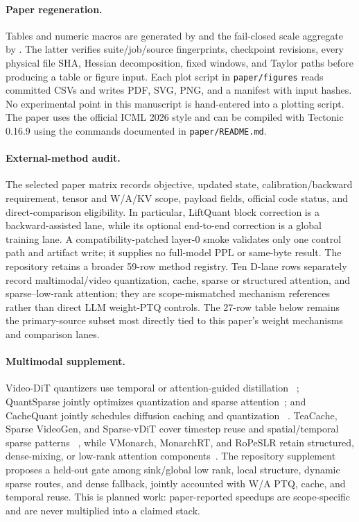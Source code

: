 \paragraph{Paper regeneration.}
Tables and numeric macros are generated by
 and the fail-closed scale
aggregate by .  The latter verifies
suite/job/source fingerprints, checkpoint revisions, every physical file SHA,
Hessian decomposition, fixed windows, and Taylor paths before producing a
table or figure input.  Each plot script in
\texttt{paper/figures} reads committed CSVs and writes PDF, SVG, PNG, and a
manifest with input hashes.  No experimental point in this manuscript is
hand-entered into a plotting script.  The paper uses the official ICML 2026
style and can be compiled with Tectonic 0.16.9 using the commands documented in
\texttt{paper/README.md}.

\paragraph{External-method audit.}
The selected paper matrix records objective, updated state,
calibration/backward requirement, tensor and W/A/KV scope, payload fields,
official code status, and direct-comparison eligibility.  In particular,
LiftQuant block correction is a backward-assisted lane, while its optional
end-to-end correction is a global training lane.  A compatibility-patched
layer-0 smoke validates only one control path and artifact write; it supplies
no full-model PPL or same-byte result.  The repository retains a broader
59-row method registry.  Ten D-lane rows separately record multimodal/video
quantization, cache, sparse or structured attention, and sparse--low-rank
attention; they are scope-mismatched mechanism references rather than direct
LLM weight-PTQ controls.  The 27-row table below remains the primary-source
subset most directly tied to this paper's weight mechanisms and comparison
lanes.

\paragraph{Multimodal supplement.}
Video-DiT quantizers use temporal or attention-guided distillation
~\citep{feng2025qvdit,feng2025s2qvdit}; QuantSparse jointly optimizes
quantization and sparse attention~\citep{feng2025quantsparse}; and CacheQuant
jointly schedules diffusion caching and quantization
~\citep{liu2025cachequant}.  TeaCache, Sparse VideoGen, and Sparse-vDiT cover
timestep reuse and spatial/temporal sparse patterns
~\citep{liu2025teacache,xi2025sparsevideogen,chen2025sparsevdit}, while
VMonarch, MonarchRT, and RoPeSLR retain structured, dense-mixing, or low-rank
attention components~\citep{liang2026vmonarch,agarwal2026monarchrt,liu2026ropeslr}.
The repository supplement proposes a held-out gate among sink/global low rank,
local structure, dynamic sparse routes, and dense fallback, jointly accounted
with W/A PTQ, cache, and temporal reuse.  This is planned work: paper-reported
speedups are scope-specific and are never multiplied into a claimed stack.

